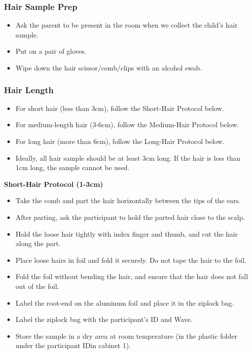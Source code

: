 \documentclass[
]{book}
\providecommand{\tightlist}{%
  \setlength{\itemsep}{0pt}\setlength{\parskip}{0pt}}
\begin{document}
\hypertarget{hair-sample-prep}{%
\subsubsection{Hair Sample Prep}\label{hair-sample-prep}}

\begin{itemize}
\tightlist
\item
  Ask the parent to be present in the room when we collect the child's hair sample.
\item
  Put on a pair of gloves.
\item
  Wipe down the hair scissor/comb/clips with an alcohol swab.
\end{itemize}

\hypertarget{hair-length}{%
\subsubsection{Hair Length}\label{hair-length}}

\begin{itemize}
\tightlist
\item
  For short hair (less than 3cm), follow the Short-Hair Protocol below.
\item
  For medium-length hair (3-6cm), follow the Medium-Hair Protocol below.
\item
  For long hair (more than 6cm), follow the Long-Hair Protocol below.
\item
  Ideally, all hair sample should be at least 3cm long. If the hair is less than 1cm long, the sample cannot be used.
\end{itemize}

\textbf{Short-Hair Protocol (1-3cm)}

\begin{itemize}
\tightlist
\item
  Take the comb and part the hair horizontally between the tips of the ears.
\item
  After parting, ask the participant to hold the parted hair close to the scalp.
\item
  Hold the loose hair tightly with index finger and thumb, and cut the hair along the part.
\item
  Place loose hairs in foil and fold it securely. Do not tape the hair to the foil.
\item
  Fold the foil without bending the hair, and ensure that the hair does not fall out of the foil.
\item
  Label the root-end on the aluminum foil and place it in the ziplock bag.
\item
  Label the ziplock bag with the participant's ID and Wave.
\item
  Store the sample in a dry area at room temperature (in the plastic folder under the participant IDin cabinet 1).
\end{itemize}
\end{document}
